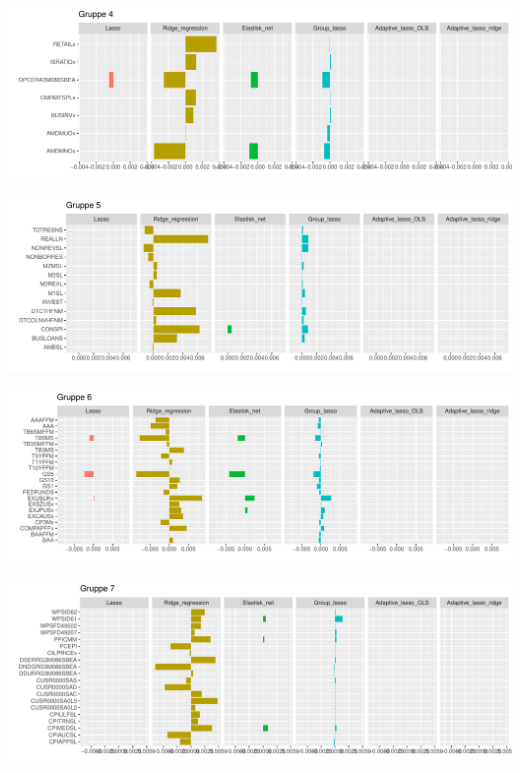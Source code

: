 \begin{landscape}
\includegraphics[scale=0.75]{fig/img/coef_group4.pdf}
\end{landscape}

\begin{landscape}
\includegraphics[scale=0.75]{fig/img/coef_group5.pdf}
\end{landscape}

\begin{landscape}
\includegraphics[scale=0.75]{fig/img/coef_group6.pdf}
\end{landscape}

\begin{landscape}
\includegraphics[scale=0.75]{fig/img/coef_group7.pdf}
\end{landscape}

